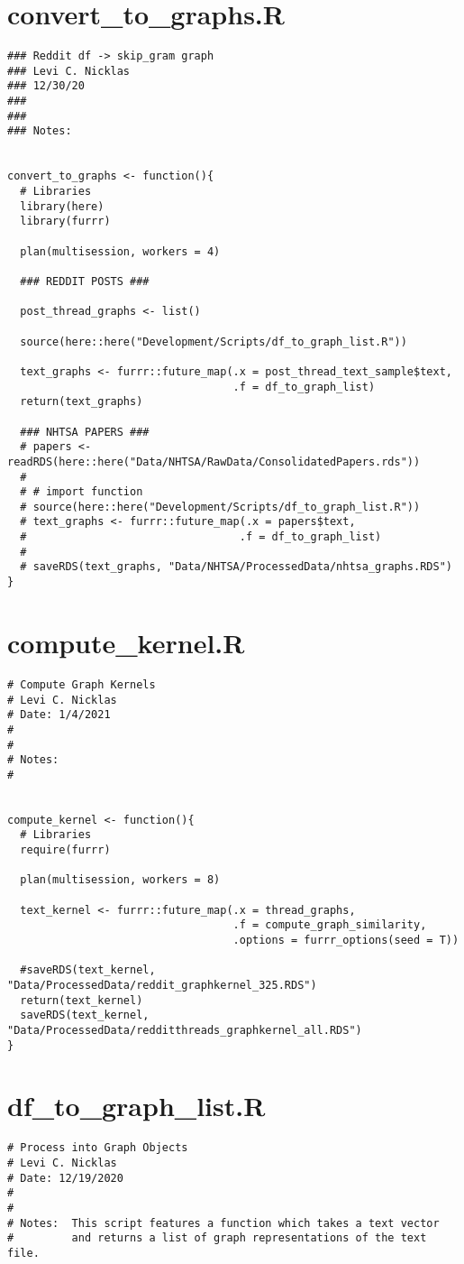 \begin{appendices}
\section{convert\_to\_graphs.R}
\begin{lstlisting}
### Reddit df -> skip_gram graph
### Levi C. Nicklas
### 12/30/20
###
###
### Notes:  


convert_to_graphs <- function(){
  # Libraries
  library(here)
  library(furrr)
  
  plan(multisession, workers = 4)
  
  ### REDDIT POSTS ###
  
  post_thread_graphs <- list()

  source(here::here("Development/Scripts/df_to_graph_list.R"))
  
  text_graphs <- furrr::future_map(.x = post_thread_text_sample$text,
                                   .f = df_to_graph_list)
  return(text_graphs)
  
  ### NHTSA PAPERS ###
  # papers <- readRDS(here::here("Data/NHTSA/RawData/ConsolidatedPapers.rds"))
  # 
  # # import function
  # source(here::here("Development/Scripts/df_to_graph_list.R"))
  # text_graphs <- furrr::future_map(.x = papers$text,
  #                                 .f = df_to_graph_list)
  # 
  # saveRDS(text_graphs, "Data/NHTSA/ProcessedData/nhtsa_graphs.RDS")
}
\end{lstlisting}

\section{compute\_kernel.R}
\begin{lstlisting}
# Compute Graph Kernels
# Levi C. Nicklas
# Date: 1/4/2021
#
#
# Notes:  
#


compute_kernel <- function(){
  # Libraries
  require(furrr)
  
  plan(multisession, workers = 8)
  
  text_kernel <- furrr::future_map(.x = thread_graphs,
                                   .f = compute_graph_similarity,
                                   .options = furrr_options(seed = T))
  
  #saveRDS(text_kernel, "Data/ProcessedData/reddit_graphkernel_325.RDS")
  return(text_kernel)
  saveRDS(text_kernel, "Data/ProcessedData/redditthreads_graphkernel_all.RDS")
}
\end{lstlisting}

\section{df\_to\_graph\_list.R}
\begin{lstlisting}
# Process into Graph Objects
# Levi C. Nicklas
# Date: 12/19/2020
#
#
# Notes:  This script features a function which takes a text vector
#         and returns a list of graph representations of the text file.


\end{lstlisting}
\end{appendices}
